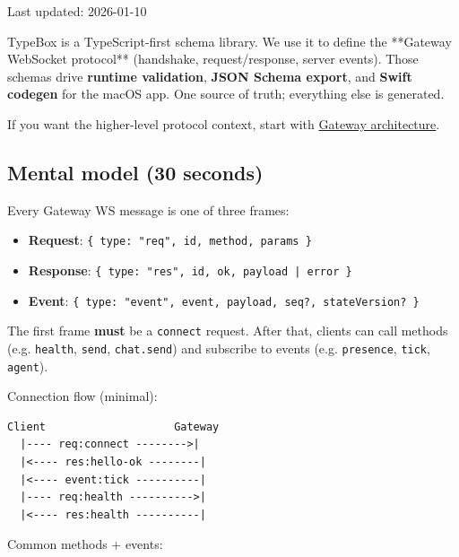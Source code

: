 Last updated: 2026-01-10

TypeBox is a TypeScript-first schema library. We use it to define the **Gateway
WebSocket protocol** (handshake, request/response, server events). Those schemas
drive \textbf{runtime validation}, \textbf{JSON Schema export}, and \textbf{Swift codegen} for
the macOS app. One source of truth; everything else is generated.

If you want the higher-level protocol context, start with
\href{/concepts/architecture}{Gateway architecture}.

\subsection{Mental model (30 seconds)}


Every Gateway WS message is one of three frames:

\begin{itemize}
  \item \textbf{Request}: \texttt{\{ type: "req", id, method, params \}}
  \item \textbf{Response}: \texttt{\{ type: "res", id, ok, payload | error \}}
  \item \textbf{Event}: \texttt{\{ type: "event", event, payload, seq?, stateVersion? \}}
\end{itemize}


The first frame \textbf{must} be a \texttt{connect} request. After that, clients can call
methods (e.g. \texttt{health}, \texttt{send}, \texttt{chat.send}) and subscribe to events (e.g.
\texttt{presence}, \texttt{tick}, \texttt{agent}).

Connection flow (minimal):

\begin{lstlisting}
Client                    Gateway
  |---- req:connect -------->|
  |<---- res:hello-ok --------|
  |<---- event:tick ----------|
  |---- req:health ---------->|
  |<---- res:health ----------|
\end{lstlisting}


Common methods + events:


